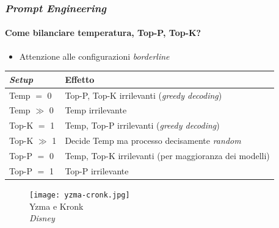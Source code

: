 %
\begin{frame}[t] \frametitle{\emph{Prompt Engineering}}
\framesubtitle{Come bilanciare temperatura, Top-P, Top-K?}
	{\small
	    \begin{minipage}[t]{\textwidth}
			\begin{minipage}[t]{0.55\textwidth}
	    		\begin{itemize}[leftmargin=10pt,align=right]
					\onslide<1->\item[\alert{\faArrowCircleRight}] Attenzione alle configurazioni \textit{borderline}
                \end{itemize}    
                {\tiny
                    \begin{table}
                    \renewcommand{\arraystretch}{1}
                    \centering
                    \begin{tabularx}{\textwidth}{p{}p{}}
                        \toprule
                        \textbf{\emph{Setup}} & \textbf{Effetto}\\
                        \midrule
                        Temp $=$ 0 & Top-P, Top-K irrilevanti (\alert{\textit{greedy decoding}})\\
                        Temp $\gg$ 0 & Temp irrilevante\\
                        \midrule
                        Top-K $=$ 1 & Temp, Top-P irrilevanti (\alert{\textit{greedy decoding}})\\
                        Top-K $\gg$ 1 & Decide Temp ma processo decisamente \textit{random}\\
                        \midrule
                        Top-P $=$ 0 & Temp, Top-K irrilevanti (per maggioranza dei modelli)\\
                        Top-P $=$ 1 & Top-P irrilevante\\
                        \bottomrule
                    \end{tabularx}
                    \end{table}
                }
            \end{minipage}
			\hfill
            \begin{minipage}[t]{0.38\textwidth}
                \centering
                \begin{figure}[ht]
                    \texttt{[image: yzma-cronk.jpg]}
                    {\tiny\\Yzma e Kronk\\\vspace*{-1pt}\textit{\textcopyright Disney}}

\end{figure}
\end{minipage}
\end{minipage}}
\end{frame}
